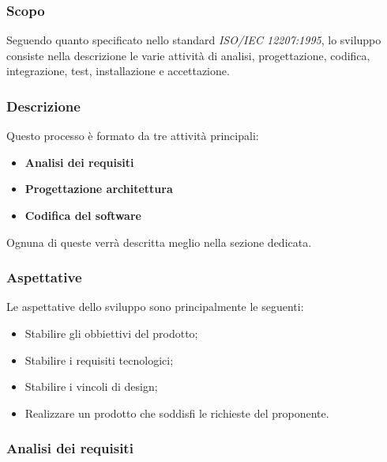 \documentclass[../norme_di_progetto.tex]{subfiles}
\begin{document}
\subsubsection{Scopo}
Seguendo quanto specificato nello standard \emph{ISO/IEC  12207:1995}, lo sviluppo consiste nella descrizione le varie attività di analisi, progettazione, codifica, integrazione, test, installazione e accettazione.

\subsubsection{Descrizione}

Questo processo è formato da tre attività principali:
\begin{itemize}
    \item \textbf{Analisi dei requisiti}
    \item \textbf{Progettazione architettura}
    \item \textbf{Codifica del software}
\end{itemize}

Ognuna di queste verrà descritta meglio nella sezione dedicata.

\subsubsection{Aspettative}
Le aspettative dello sviluppo sono principalmente le seguenti:
\begin{itemize}

\item Stabilire gli obbiettivi del prodotto;
\item Stabilire i requisiti tecnologici;
\item Stabilire i vincoli di design;
\item Realizzare un prodotto che soddisfi le richieste del proponente.

\end{itemize}

\subsubsection{Analisi dei requisiti}
\end{document}
